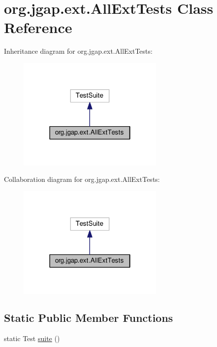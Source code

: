 \hypertarget{classorg_1_1jgap_1_1ext_1_1_all_ext_tests}{\section{org.\-jgap.\-ext.\-All\-Ext\-Tests Class Reference}
\label{classorg_1_1jgap_1_1ext_1_1_all_ext_tests}
}


Inheritance diagram for org.\-jgap.\-ext.\-All\-Ext\-Tests\-:
\nopagebreak
\begin{figure}[H]
\begin{center}
\leavevmode
\includegraphics[width=202pt]{classorg_1_1jgap_1_1ext_1_1_all_ext_tests__inherit__graph}
\end{center}
\end{figure}


Collaboration diagram for org.\-jgap.\-ext.\-All\-Ext\-Tests\-:
\nopagebreak
\begin{figure}[H]
\begin{center}
\leavevmode
\includegraphics[width=202pt]{classorg_1_1jgap_1_1ext_1_1_all_ext_tests__coll__graph}
\end{center}
\end{figure}
\subsection*{Static Public Member Functions}
\begin{DoxyCompactItemize}
\item 
static Test \hyperlink{classorg_1_1jgap_1_1ext_1_1_all_ext_tests_ad07819432cdcb928623a9cc5e3458d9e}{suite} ()
\end{DoxyCompactItemize}
